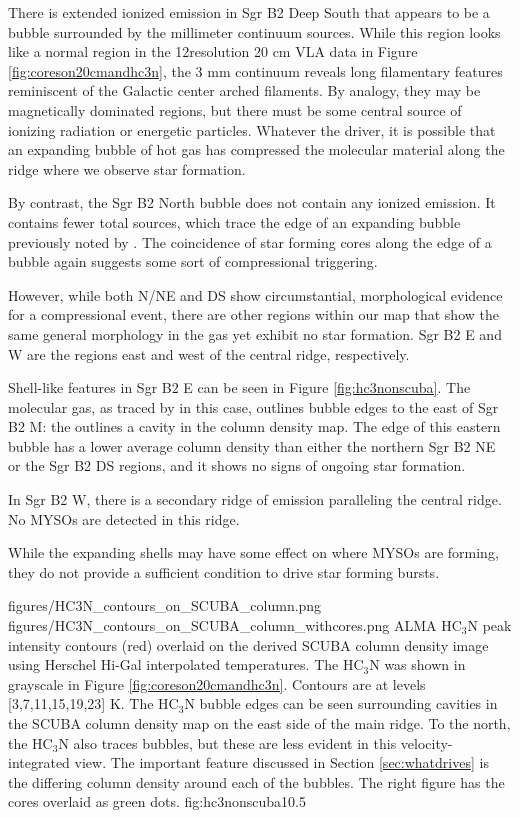 \documentclass[twocolumn]{aastex61}
\begin{document}
There is extended ionized emission in Sgr B2 Deep South that appears to be a
bubble surrounded by the millimeter continuum sources.  While this region looks
like a normal \hii region in the 12\arcsec resolution 20 cm
VLA data in Figure \ref{fig:coreson20cmandhc3n}, the 3 mm continuum reveals long
filamentary features reminiscent of the Galactic center arched filaments.  By
analogy, they may be magnetically dominated regions, but there must be some
central source of ionizing radiation or energetic particles.  Whatever the
driver, it is possible that an expanding bubble of hot gas has compressed
the molecular material along the ridge where we observe star formation.

By contrast, the Sgr B2 North bubble does not contain any ionized emission.  It
contains fewer total sources, which trace the edge of an expanding bubble
previously noted by \citet{de-Vicente1997a}.  The coincidence of star forming
cores along the edge of a bubble again suggests some sort of compressional
triggering.

However, while both N/NE and DS show circumstantial, morphological evidence
for a compressional event, there are other regions within our map that show
the same general morphology in the gas yet exhibit no star formation.
Sgr B2 E and W are the regions east and west of the central ridge, respectively.

Shell-like features in Sgr B2 E can be seen in Figure \ref{fig:hc3nonscuba}.
The molecular gas, as traced by \cyanoacetylene in this case, outlines bubble edges to
the east of Sgr B2 M: the \cyanoacetylene outlines a cavity in the column density map.
The edge of this eastern bubble has a lower average column density than either
the northern Sgr B2 NE or the Sgr B2 DS regions, and it shows no signs of
ongoing star formation. 

In Sgr B2 W, there is a secondary ridge of \cyanoacetylene emission paralleling
the central ridge.  No MYSOs are detected in this ridge.

While the expanding shells may have some effect on where MYSOs are forming,
they do not provide a sufficient condition to drive star forming bursts.


\FigureTwo
{figures/HC3N_contours_on_SCUBA_column.png}
{figures/HC3N_contours_on_SCUBA_column_withcores.png}
{ALMA HC$_3$N peak intensity contours (red) overlaid on the derived SCUBA
column density
image using Herschel Hi-Gal interpolated temperatures. The HC$_3$N was
shown in grayscale in Figure \ref{fig:coreson20cmandhc3n}.
Contours are at levels [3,7,11,15,19,23] K.  The  HC$_3$N bubble edges can be
seen surrounding cavities in the SCUBA column density map on the east side of
the main ridge.  To the north, the HC$_3$N also traces bubbles, but these are
less evident in this velocity-integrated view.  The important feature discussed
in Section \ref{sec:whatdrives} is the differing column density around each of
the bubbles.  The right figure has the cores overlaid as green dots.}
{fig:hc3nonscuba}{1}{0.5\textwidth}
\end{document}
